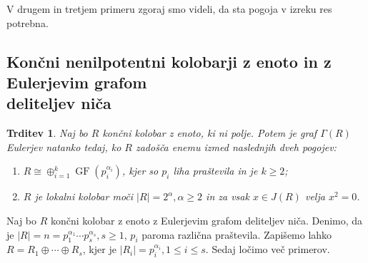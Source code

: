 \documentclass[a4paper, 12pt]{amsart}
\theoremstyle{definition} %
\theoremstyle{plain} %
\newtheorem{trditev}[definicija]{Trditev}
\DeclareMathOperator{\GF}{GF}
\begin{document}
V drugem in tretjem primeru zgoraj smo videli, da sta pogoja v izreku res potrebna.


\subsection{Končni nenilpotentni kolobarji z enoto in z Eulerjevim grafom \\deliteljev niča}

\begin{trditev}
\label{EulerEnotski}
Naj bo $R$ končni kolobar z enoto, ki ni polje. Potem je graf $\Gamma(R)$ Eulerjev natanko tedaj, ko $R$ zadošča enemu izmed naslednjih dveh pogojev:
\begin{enumerate}
\item $R \cong \oplus_{i=1}^k \GF(p_i^{\alpha_i})$, kjer so $p_i$ liha praštevila in je $k\ge 2$;
\item $R$ je lokalni kolobar moči $|R| = 2^{\alpha}, \alpha \ge 2$ in za vsak $x\in J(R)$ velja $x^2 = 0$.
\end{enumerate}
\end{trditev}

\proof
Naj bo $R$ končni kolobar z enoto z Eulerjevim grafom deliteljev niča. Denimo, da je $|R| = n = p_1^{\alpha_1}\cdots p_s^{\alpha_s}, s\ge 1$, $p_i$ paroma različna praštevila. Zapišemo lahko $R=R_1\oplus \cdots \oplus R_s$, kjer je $|R_i| = p_i^{\alpha_i}, 1 \le i \le s$. Sedaj ločimo več primerov.
\end{document}
